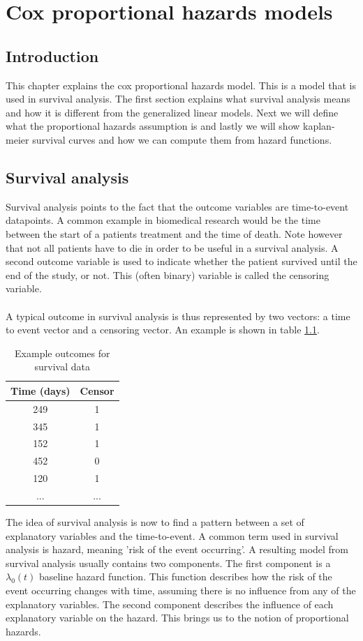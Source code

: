 \chapter{Cox proportional hazards models}
\label{cha:cox}

\section{Introduction}
\label{sec:cox-introduction}
This chapter explains the cox proportional hazards model\cite{simon2011regularization}\cite{tibshirani1997lasso}\cite{wikicox}. This is a model that is used in survival analysis. The first section explains what survival analysis means and how it is different from the generalized linear models. Next we will define what the proportional hazards assumption is and lastly we will show kaplan-meier survival curves and how we can compute them from hazard functions.

\section{Survival analysis}
\label{sec:cox-survival-analysis}
Survival analysis points to the fact that the outcome variables are time-to-event datapoints. A common example in biomedical research would be the time between the start of a patients treatment and the time of death. Note however that not all patients have to die in order to be useful in a survival analysis. A second outcome variable is used to indicate whether the patient survived until the end of the study, or not. This (often binary) variable is called the censoring variable. \\ \\
A typical outcome in survival analysis is thus represented by two vectors: a time to event vector and a censoring vector. An example is shown in table \ref{tab:cox-example-outcome}.
\begin{table}
	\centering
	\begin{tabular}{cc}
		\toprule
		Time (days) & Censor\\
		\midrule
		249 & 1 \\
		345 & 1 \\
		152 & 1 \\
		452 & 0 \\
		120 & 1 \\
		... & ... \\
		\bottomrule
	\end{tabular}
	\caption{Example outcomes for survival data}
	\label{tab:cox-example-outcome}
\end{table}
The idea of survival analysis is now to find a pattern between a set of explanatory variables and the time-to-event. A common term used in survival analysis is hazard, meaning 'risk of the event occurring'. A resulting model from survival analysis usually contains two components. The first component is a $\lambda_{0}(t)$ baseline hazard function. This function describes how the risk of the event occurring changes with time, assuming there is no influence from any of the explanatory variables. The second component describes the influence of each explanatory variable on the hazard. This brings us to the notion of proportional hazards.

